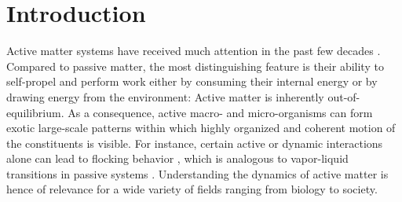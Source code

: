 \documentclass[aps,prx,reprint,showpacs,showkeys,noeprint,longbibliography]{revtex4-1} %
\begin{document}
\section{ Introduction}
\par 
Active matter systems have received much attention in the past few decades \cite{ramasw1, cates1, elgeti1, shaeb}. Compared to passive matter, the 
most distinguishing feature is their ability to self-propel and perform work either by consuming their internal energy or by drawing energy from the environment: Active matter is inherently out-of-equilibrium. As a consequence, active macro- and micro-organisms can form exotic large-scale patterns within which highly organized and coherent motion of the constituents is visible. For instance, certain active or dynamic interactions alone can lead to flocking behavior \cite{fily,vicsek}, which is analogous to vapor-liquid transitions in passive systems \cite{fily,redner,skdas14,trefz16,das1,paul1,vicsek}. Understanding the dynamics of active matter is hence of relevance for a wide variety of fields ranging from biology to society.
\end{document}
